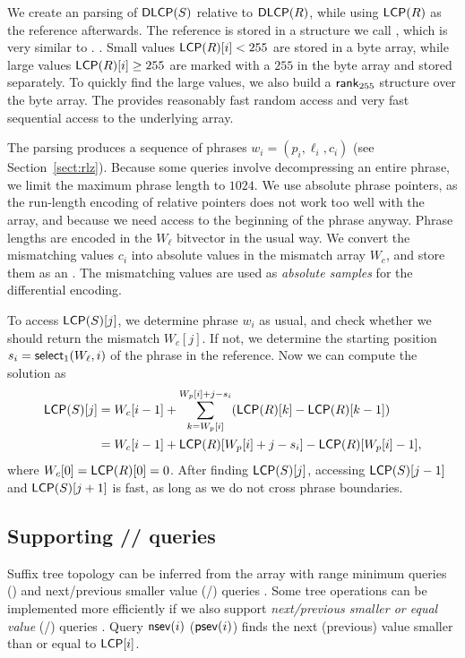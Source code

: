 We create an \RLZ{} parsing of $\mathsf{DLCP}(S)$ relative to $\mathsf{DLCP}(R)$, while
using $\mathsf{LCP}(R)$ as the reference afterwards. The reference is stored in a
structure we call \slarray, which is very similar to \LCPbyte.
\cite{Abouelhoda2004}. Small values $\mathsf{LCP}(R)[i] < 255$ are stored in a byte
array, while large values $\mathsf{LCP}(R)[i] \ge 255$ are marked with a $255$ in the
byte array and stored separately. To quickly find the large values, we also
build a $\mathsf{rank}_{255}$ structure over the byte array. The \slarray{} provides
reasonably fast random access and very fast sequential access to the
underlying array.

The \RLZ{} parsing produces a sequence of phrases $w_{i} = (p_{i}, \ell_{i},
c_{i})$ (see Section~\ref{sect:rlz}). Because some queries involve
decompressing an entire phrase, we limit the maximum phrase length to $1024$.
We use absolute phrase pointers, as the run-length encoding of relative
pointers does not work too well with the \DLCP{} array, and because we need
access to the beginning of the phrase anyway. Phrase lengths are encoded in
the $W_{\ell}$ bitvector in the usual way. We convert the mismatching \DLCP{}
values $c_{i}$ into absolute \LCP{} values in the mismatch array $W_{c}$, and
store them as an \slarray. The mismatching values are used as \emph{absolute
samples} for the differential encoding.

To access $\mathsf{LCP}(S)[j]$, we determine phrase $w_{i}$ as usual, and check
whether we should return the mismatch $W_{c}[j]$. If not, we determine the
starting position $s_{i} = \mathsf{select}_{1}(W_{\ell}, i)$ of the phrase in the
reference. Now we can compute the solution as
\begin{align*}
\mathsf{LCP}(S)[j] &= W_{c}[i-1] + \sum_{k = W_{p}[i]}^{W_{p}[i]+j-s_{i}}
(\mathsf{LCP}(R)[k] - \mathsf{LCP}(R)[k-1]) \\
&= W_{c}[i-1] + \mathsf{LCP}(R)[W_{p}[i]+j-s_{i}] - \mathsf{LCP}(R)[W_{p}[i]-1],
\end{align*}
where $W_{c}[0] = \mathsf{LCP}(R)[0] = 0$. After finding $\mathsf{LCP}(S)[j]$, accessing
$\mathsf{LCP}(S)[j-1]$ and $\mathsf{LCP}(S)[j+1]$ is fast, as long as we do not cross phrase
boundaries.

\subsection{Supporting \nsv/\psv/\rmq{} queries}

Suffix tree topology can be inferred from the \LCP{} array with range minimum
queries (\rmq) and next/previous smaller value (\nsv/\psv) queries
\cite{Fischer2009a}. Some tree operations can be implemented more efficiently
if we also support \emph{next/previous smaller or equal value} (\nsev/\psev)
queries \cite{Abeliuk2013}. Query $\mathsf{nsev}(i)$ ($\mathsf{psev}(i)$) finds the next
(previous) value smaller than or equal to $\mathsf{LCP}[i]$.

